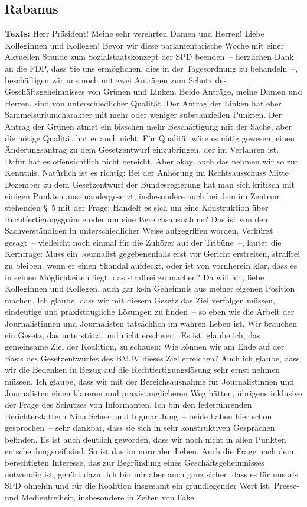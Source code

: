 \documentclass{article}
\begin{document}
\subsection{Rabanus}
\noindent\textbf{Texts:} Herr Präsident! Meine sehr verehrten Damen und Herren! Liebe Kolleginnen und Kollegen! Bevor wir diese parlamentarische Woche mit einer Aktuellen Stunde zum Sozialstaatskonzept der SPD beenden – herzlichen Dank an die FDP, dass Sie uns ermöglichen, dies in der Tagesordnung zu behandeln –,  beschäftigen wir uns noch mit zwei Anträgen zum Schutz des Geschäftsgeheimnisses von Grünen und Linken. Beide Anträge, meine Damen und Herren, sind von unterschiedlicher Qualität. Der Antrag der Linken hat eher Sammelsuriumcharakter mit mehr oder weniger substanziellen Punkten. Der Antrag der Grünen atmet ein bisschen mehr Beschäftigung mit der Sache, aber die nötige Qualität hat er auch nicht.  Für Qualität wäre es nötig gewesen, einen Änderungsantrag zu dem Gesetzentwurf einzubringen, der im Verfahren ist. Dafür hat es offensichtlich nicht gereicht. Aber okay, auch das nehmen wir so zur Kenntnis.  Natürlich ist es richtig: Bei der Anhörung im Rechtsausschuss Mitte Dezember zu dem Gesetzentwurf der Bundesregierung hat man sich kritisch mit einigen Punkten auseinandergesetzt,  insbesondere auch bei dem im Zentrum stehenden § 5 mit der Frage: Handelt es sich um eine Konstruktion über Rechtfertigungsgründe oder um eine Bereichsausnahme? Das ist von den Sachverständigen in unterschiedlicher Weise aufgegriffen worden. Verkürzt gesagt – vielleicht noch einmal für die Zuhörer auf der Tribüne –, lautet die Kernfrage: Muss ein Journalist gegebenenfalls erst vor Gericht erstreiten, straffrei zu bleiben, wenn er einen Skandal aufdeckt, oder ist von vornherein klar, dass es in seinen Möglichkeiten liegt, das straffrei zu machen? Da will ich, liebe Kolleginnen und Kollegen, auch gar kein Geheimnis aus meiner eigenen Position machen. Ich glaube, dass wir mit diesem Gesetz das Ziel verfolgen müssen, eindeutige und praxistaugliche Lösungen zu finden – so eben wie die Arbeit der Journalistinnen und Journalisten tatsächlich im wahren Leben ist. Wir brauchen ein Gesetz, das unterstützt und nicht erschwert. Es ist, glaube ich, das gemeinsame Ziel der Koalition, zu schauen: Wie können wir am Ende auf der Basis des Gesetzentwurfes des BMJV dieses Ziel erreichen? Auch ich glaube, dass wir die Bedenken in Bezug auf die Rechtfertigungslösung sehr ernst nehmen müssen. Ich glaube, dass wir mit der Bereichsausnahme für Journalistinnen und Journalisten einen klareren und praxistauglicheren Weg hätten,  übrigens inklusive der Frage des Schutzes von Informanten.  Ich bin den federführenden Berichterstattern Nina Scheer und Ingmar Jung – beide haben hier schon gesprochen – sehr dankbar, dass sie sich in sehr konstruktiven Gesprächen befinden. Es ist auch deutlich geworden, dass wir noch nicht in allen Punkten entscheidungsreif sind.  So ist das im normalen Leben. Auch die Frage nach dem berechtigten Interesse, das zur Begründung eines Geschäftsgeheimnisses notwendig ist, gehört dazu. Ich bin mir aber auch ganz sicher, dass es für uns als SPD ohnehin und für die Koalition insgesamt ein grundlegender Wert ist, Presse- und Medienfreiheit, insbesondere in Zeiten von Fake 
\end{document}
